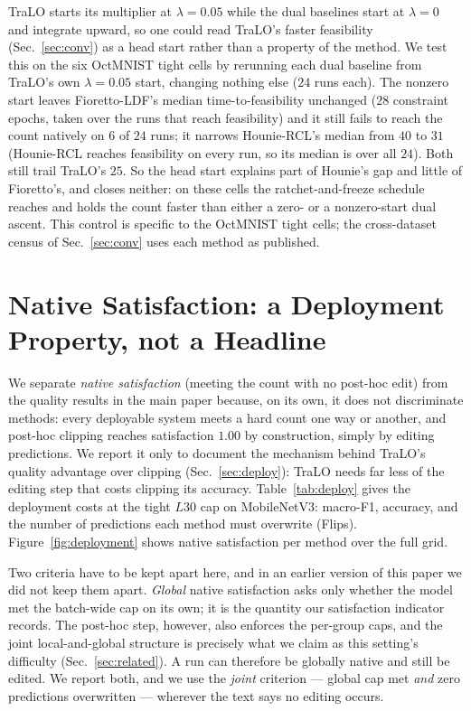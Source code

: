 \documentclass[10pt]{article}
\begin{document}
TraLO starts its multiplier at $\lambda{=}0.05$ while the dual
baselines start at $\lambda{=}0$ and integrate upward, so one could
read TraLO's faster feasibility (Sec.~\ref{sec:conv}) as a head start
rather than a property of the method. We test this on the six OctMNIST
tight cells by rerunning each dual baseline from TraLO's own
$\lambda{=}0.05$ start, changing nothing else ($24$ runs each). The
nonzero start leaves Fioretto-LDF's median time-to-feasibility
unchanged ($28$ constraint epochs, taken over the runs that reach
feasibility) and it still fails to reach the count natively on $6$ of
$24$ runs; it narrows Hounie-RCL's median from $40$ to $31$
(Hounie-RCL reaches feasibility on every run, so its median is over
all $24$). Both still trail TraLO's $25$. So the head start explains
part of Hounie's gap and little of Fioretto's, and closes neither: on
these cells the ratchet-and-freeze schedule reaches and holds the
count faster than either a zero- or a nonzero-start dual ascent. This
control is specific to the OctMNIST tight cells; the cross-dataset
census of Sec.~\ref{sec:conv} uses each method as published.



\section{Native Satisfaction: a Deployment Property, not a Headline}
\label{app:deploy}




We separate \emph{native satisfaction} (meeting the count with no
post-hoc edit) from the quality results in the main paper because, on
its own, it does not discriminate methods: every deployable system meets
a hard count one way or another, and post-hoc clipping reaches
satisfaction $1.00$ by construction, simply by editing predictions. We
report it only to document the mechanism behind TraLO's quality
advantage over clipping (Sec.~\ref{sec:deploy}): {TraLO needs far less of the editing
step that costs clipping its accuracy.} Table~\ref{tab:deploy} gives the deployment costs
at the tight $L30$ cap on MobileNetV3: macro-F1, accuracy, and the
number of predictions each method must overwrite (Flips).
Figure~\ref{fig:deployment} shows native satisfaction per method over
the full grid.

{Two criteria have to be kept apart here, and in an earlier version of
this paper we did not keep them apart. \emph{Global} native satisfaction asks
only whether the model met the batch-wide cap on its own; it is the quantity our
satisfaction indicator records. The post-hoc step, however, also enforces the
per-group caps, and the joint local-and-global structure is precisely what we
claim as this setting's difficulty (Sec.~\ref{sec:related}). A run can therefore
be globally native and still be edited. We report both, and we use the
\emph{joint} criterion --- global cap met \emph{and} zero predictions
overwritten --- wherever the text says no editing occurs.}
\end{document}
